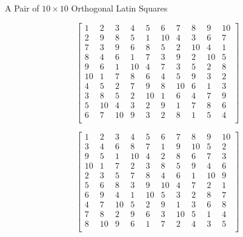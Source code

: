 \documentclass[12pt]{article}
\begin{document}
\begin{center}
  A Pair of $10\times10$ Orthogonal Latin Squares
\end{center}
\[
\left[
\begin{array}{cccccccccc}
1 & 2 & 3 & 4 & 5 & 6 & 7 & 8 & 9 & 10 \\
2 & 9 & 8 & 5 & 1 & 10 & 4 & 3 & 6 & 7 \\
7 & 3 & 9 & 6 & 8 & 5 & 2 & 10 & 4 & 1 \\
8 & 4 & 6 & 1 & 7 & 3 & 9 & 2 & 10 & 5 \\
9 & 6 & 1 & 10 & 4 & 7 & 3 & 5 & 2 & 8 \\
10 & 1 & 7 & 8 & 6 & 4 & 5 & 9 & 3 & 2 \\
4 & 5 & 2 & 7 & 9 & 8 & 10 & 6 & 1 & 3 \\
3 & 8 & 5 & 2 & 10 & 1 & 6 & 4 & 7 & 9 \\
5 & 10 & 4 & 3 & 2 & 9 & 1 & 7 & 8 & 6 \\
6 & 7 & 10 & 9 & 3 & 2 & 8 & 1 & 5 & 4 \\
\end{array}
\right]
\]

\[
\left[
\begin{array}{cccccccccc}
1 & 2 & 3 & 4 & 5 & 6 & 7 & 8 & 9 & 10 \\
3 & 4 & 6 & 8 & 7 & 1 & 9 & 10 & 5 & 2 \\
9 & 5 & 1 & 10 & 4 & 2 & 8 & 6 & 7 & 3 \\
10 & 1 & 7 & 2 & 3 & 8 & 5 & 9 & 4 & 6 \\
2 & 3 & 5 & 7 & 8 & 4 & 6 & 1 & 10 & 9 \\
5 & 6 & 8 & 3 & 9 & 10 & 4 & 7 & 2 & 1 \\
6 & 9 & 4 & 1 & 10 & 5 & 3 & 2 & 8 & 7 \\
4 & 7 & 10 & 5 & 2 & 9 & 1 & 3 & 6 & 8 \\
7 & 8 & 2 & 9 & 6 & 3 & 10 & 5 & 1 & 4 \\
8 & 10 & 9 & 6 & 1 & 7 & 2 & 4 & 3 & 5 \\
\end{array}
\right]
\]
\end{document}
